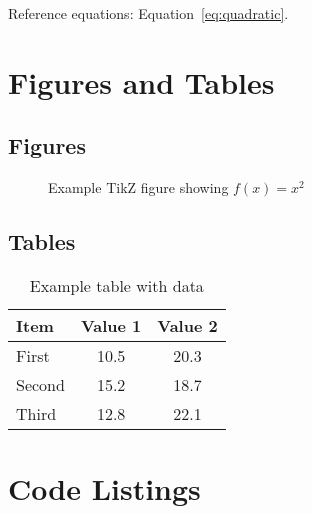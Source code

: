 \documentclass[
    language=english,
    institution=none,        %
    oneside,                 %
    loadGlossaries,          %
]{../../omnilatex}
\begin{document}
Reference equations: Equation~\eqref{eq:quadratic}.

\chapter{Figures and Tables}

\section{Figures}

\begin{figure}[htbp]
    \centering
    \caption{Example TikZ figure showing $f(x) = x^2$}
    \label{fig:example}
\end{figure}


\section{Tables}

\begin{table}[htbp]
    \centering
    \caption{Example table with data}
    \label{tab:example}
    \begin{tabular}{lcc}
        \toprule
        \textbf{Item} & \textbf{Value 1} & \textbf{Value 2} \\
        \midrule
        First  & 10.5 & 20.3 \\
        Second & 15.2 & 18.7 \\
        Third  & 12.8 & 22.1 \\
        \bottomrule
    \end{tabular}
\end{table}

\chapter{Code Listings}
\end{document}

